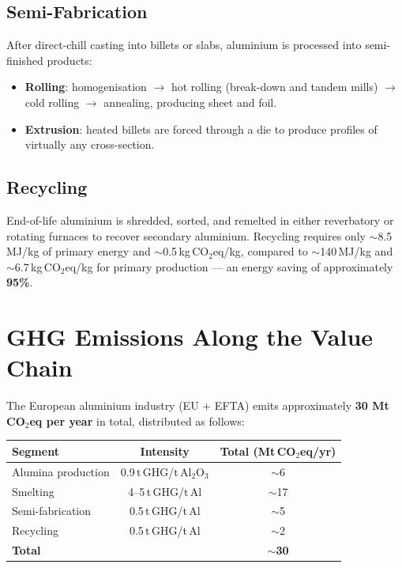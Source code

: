 \subsection{Semi-Fabrication}

After direct-chill casting into billets or slabs, aluminium is processed into semi-finished products:

\begin{itemize}
    \item \textbf{Rolling}: homogenisation $\rightarrow$ hot rolling (break-down and tandem mills)
          $\rightarrow$ cold rolling $\rightarrow$ annealing, producing sheet and foil.
    \item \textbf{Extrusion}: heated billets are forced through a die to produce profiles of
          virtually any cross-section.
\end{itemize}

\subsection{Recycling}

End-of-life aluminium is shredded, sorted, and remelted in either reverbatory or rotating furnaces
to recover secondary aluminium. Recycling requires only $\sim$8.5\,MJ/kg of primary energy and
$\sim$0.5\,kg\,CO$_2$eq/kg, compared to $\sim$140\,MJ/kg and $\sim$6.7\,kg\,CO$_2$eq/kg for
primary production — an energy saving of approximately \textbf{95\%}.

\section{GHG Emissions Along the Value Chain}

The European aluminium industry (EU + EFTA) emits approximately \textbf{30 Mt\,CO$_2$eq per
year} in total, distributed as follows:

\begin{center}
\begin{tabular}{lcc}
\toprule
\textbf{Segment} & \textbf{Intensity} & \textbf{Total (Mt\,CO$_2$eq/yr)} \\
\midrule
Alumina production    & 0.9\,t\,GHG/t\,Al$_2$O$_3$ & $\sim$6  \\
Smelting              & 4--5\,t\,GHG/t\,Al           & $\sim$17 \\
Semi-fabrication      & 0.5\,t\,GHG/t\,Al            & $\sim$5  \\
Recycling             & 0.5\,t\,GHG/t\,Al            & $\sim$2  \\
\midrule
\textbf{Total}        &                               & $\sim$\textbf{30}  \\
\bottomrule
\end{tabular}
\end{center}

